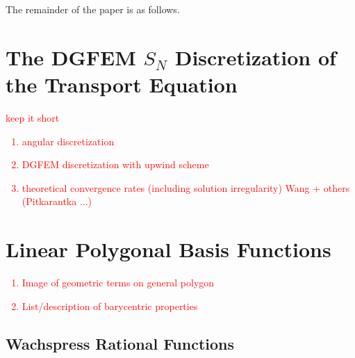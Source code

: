 \documentclass[preprint,10pt]{elsarticle}
\newcommand{\tcr}[1]{\textcolor{red}{#1}}
\newcommand{\Introfigpath}[1]{../../../Document/Rev0/figures/sec_Intro/{#1}}
\begin{document}
\iffalse
\begin{figure}[hbt]
\centering
\texttt{[image: \\Introfigpath\{locally\_refined\_vertices.png]}}
\caption{Local mesh refinement of an initial quadrilateral cell (left) leads to a degenerate pentagonal cell (right) without the use of a hanging node.}
\label{fig::Intro_locally_refined_vertices}
\end{figure}
\fi

The remainder of the paper is as follows.

\section{The DGFEM $S_N$ Discretization of the Transport Equation} \label{sec::dgfem}
\tcr
{ keep it short
\begin{enumerate}
\item angular discretization
\item DGFEM discretization with upwind scheme
\item theoretical convergence rates (including solution irregularity) Wang + others (Pitkarantka ...)
\end{enumerate}
}


\section{Linear Polygonal Basis Functions} \label{sec::linpoly}
\tcr
{
\begin{enumerate}
\item Image of geometric terms on general polygon
\item List/description of barycentric properties
\end{enumerate}
}

\subsection{Wachspress Rational Functions}
\end{document}
